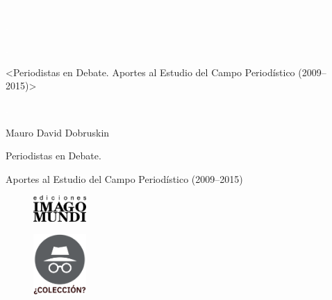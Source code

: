 \newpage
\thispagestyle{empty}
{\textcolor{white}{.}}

\newpage
\thispagestyle{empty}
{\textcolor{white}{.}}

\newpage
\thispagestyle{empty}
{\textcolor{white}{.}}

\vspace{30mm}

\begin{center}
	\LARGE{<Periodistas en Debate. Aportes al Estudio del Campo Periodístico (2009--2015)>}
\end{center}

\newpage
\thispagestyle{empty}
{\textcolor{white}{.}}

\newpage
\thispagestyle{empty}
\begin{center}%
{\sc\large{Mauro David Dobruskin}}\\ %
\end{center}

\vspace{30mm}

\begin{center}
\LARGE{Periodistas en Debate.}\\\vspace{10mm}

\Large{Aportes al Estudio del Campo Periodístico (2009--2015)}
\end{center}

\vfill

\begin{figure}[b]
\centering
\includegraphics[width=20mm]{./media/logo-imago-ByW.png}
\end{figure}

\newpage
\thispagestyle{empty}
\begin{figure}[t]
\centering
\vspace{-10mm}
\includegraphics[width=20mm]{./media/desconocido.png}\\
\end{figure}


